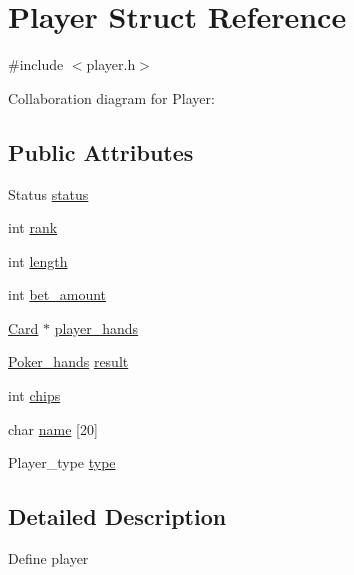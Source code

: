 \hypertarget{structPlayer}{\section{Player Struct Reference}
\label{structPlayer}
}


{\ttfamily \#include $<$player.\+h$>$}



Collaboration diagram for Player\+:
\subsection*{Public Attributes}
\begin{DoxyCompactItemize}
\item 
Status \hyperlink{structPlayer_aeb08943a32834515e66222d2e948292d}{status}
\item 
int \hyperlink{structPlayer_a307c222c67b1318ec1d7dc9095c50a98}{rank}
\item 
int \hyperlink{structPlayer_a8f9727475d39a22eec59dd3905357e9e}{length}
\item 
int \hyperlink{structPlayer_a37afeb42d31865a99f75c357f46dad88}{bet\+\_\+amount}
\item 
\hyperlink{structCard}{Card} $\ast$ \hyperlink{structPlayer_a01bb1b5125e4aad0e98d16c7d68b059e}{player\+\_\+hands}
\item 
\hyperlink{structPoker__hands}{Poker\+\_\+hands} \hyperlink{structPlayer_a6c2e05abd5b83faf72239511f992af36}{result}
\item 
int \hyperlink{structPlayer_a29614b447e37b1c5da87d0f2f75441d5}{chips}
\item 
char \hyperlink{structPlayer_ab71c17a9d17662887a1ecd0b32fe8812}{name} \mbox{[}20\mbox{]}
\item 
Player\+\_\+type \hyperlink{structPlayer_a89a4fdb70177957727ae3816b962ca2f}{type}
\end{DoxyCompactItemize}


\subsection{Detailed Description}
Define player 

